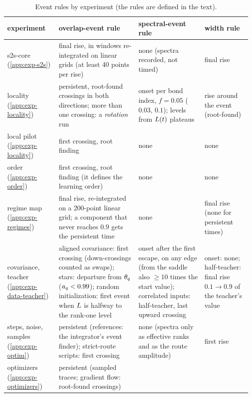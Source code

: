 \begin{table}[t]
  \centering
  \caption{Event rules by experiment (the rules are defined in the text).}
  \label{tab:exp-common}\label{tab:exp-events}
  \footnotesize
  \setlength{\tabcolsep}{3pt}
  \begin{tabularx}{\textwidth}{@{}>{\raggedright\arraybackslash}p{2.6cm}>{\raggedright\arraybackslash}X
      >{\raggedright\arraybackslash}p{4.0cm}>{\raggedright\arraybackslash}p{3.0cm}@{}}
    \toprule
    experiment & overlap-event rule & spectral-event rule & width rule \\
    \midrule
    s2s-core (\ref{app:exp-s2s}) & final rise, in windows re-integrated on linear grids (at least 40 points per
      rise) & none (spectra recorded, not timed) & final rise \\
    locality (\ref{app:exp-locality}) & persistent, root-found crossings in both directions; more than one
      crossing: a \emph{rotation} run & onset per bond index, $f=0.05$ ($0.03$, $0.1$); levels from $L(t)$
      plateaus & rise around the event (root-found) \\
    local pilot (\ref{app:exp-locality}) & first crossing, root finding & none & none \\
    order (\ref{app:exp-order}) & first crossing, root finding (it defines the learning order) & none & none \\
    regime map (\ref{app:exp-regimes}) & final rise, re-integrated on a 200-point linear grid; a component
      that never reaches $0.9$ gets the persistent time & none & final rise (none for persistent times) \\
    covariance, teacher (\ref{app:exp-data-teacher}) & aligned covariance: first crossing (down-crossings
      counted as swaps); stars: departure from $\theta_q$ ($a_{q}<0.99$); random initialization: first event when
      $L$ is halfway to the rank-one level & onset after the first escape, on any edge (from the saddle also
      $\ge10$ times the start value); correlated inputs: half-teacher, last upward crossing & onset: none;
      half-teacher: final rise $0.1\to0.9$ of the teacher's value \\
    steps, noise, samples (\ref{app:exp-optim}) & persistent (references: the integrator's event finder);
      strict-route scripts: first crossing & none (spectra only as effective ranks and as the route amplitude)
      & first rise \\
    optimizers (\ref{app:exp-optimizers}) & persistent (sampled traces; gradient flow: root-found crossings) &

\end{tabularx}
\end{table}
